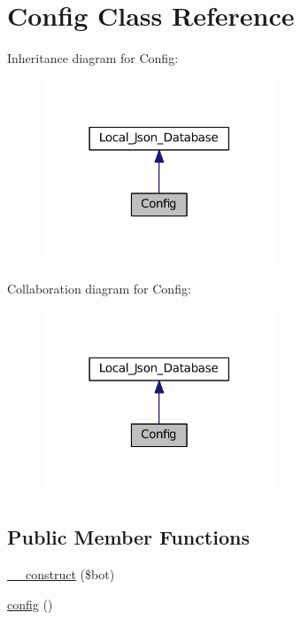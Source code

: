 \hypertarget{classConfig}{}\section{Config Class Reference}
\label{classConfig}


Inheritance diagram for Config\+:
\nopagebreak
\begin{figure}[H]
\begin{center}
\leavevmode
\includegraphics[width=198pt]{d4/d16/classConfig__inherit__graph}
\end{center}
\end{figure}


Collaboration diagram for Config\+:
\nopagebreak
\begin{figure}[H]
\begin{center}
\leavevmode
\includegraphics[width=198pt]{d8/d04/classConfig__coll__graph}
\end{center}
\end{figure}
\subsection*{Public Member Functions}
\begin{DoxyCompactItemize}
\item 
\hyperlink{classConfig_a54716506e6035d7e976d76fde3841a48}{\+\_\+\+\_\+construct} (\$bot)
\item 
\hyperlink{classConfig_acc865904ab787462a26b1079bac00826}{config} ()
\end{DoxyCompactItemize}
